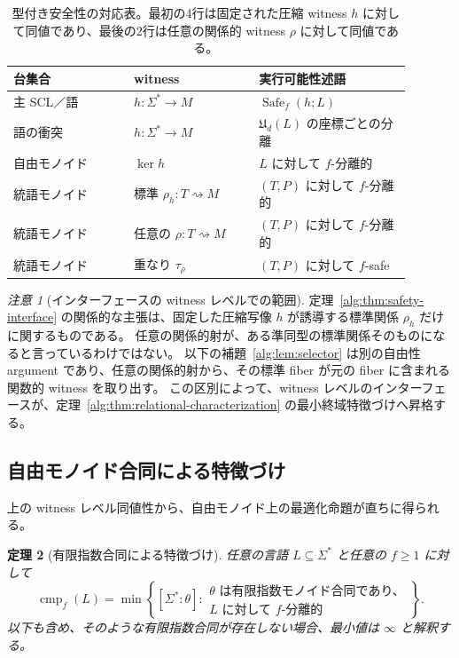 \documentclass[10pt,a4paper]{ltjsarticle}
\newtheorem{theorem}{定理}[section]
\theoremstyle{definition}
\theoremstyle{remark}
\newtheorem{remark}[theorem]{注意}
\newcommand{\cmp}{\operatorname{cmp}}
\newcommand{\relto}{\mathrel{\rightsquigarrow}}
\begin{document}
\begin{table}[t]
\centering
\caption{型付き安全性の対応表。最初の4行は固定された圧縮 witness $h$ に対して同値であり、最後の2行は任意の関係的 witness $\rho$ に対して同値である。}
\label{tab:typed-safety-dictionary}
\small
\begin{tabular}{@{}>{\raggedright\arraybackslash}p{0.27\linewidth}
                  >{\raggedright\arraybackslash}p{0.28\linewidth}
                  >{\raggedright\arraybackslash}p{0.34\linewidth}@{}}
\toprule
\textbf{台集合} & \textbf{witness} & \textbf{実行可能性述語}\\
\midrule
主 SCL／語 & $h:\Sigma^*\to M$ & $\operatorname{Safe}_f(h;L)$\\
語の衝突 & $h:\Sigma^*\to M$ & $\mathfrak U_d(L)$ の座標ごとの分離\\
自由モノイド & $\ker h$ & $L$ に対して $f$-分離的\\
統語モノイド & 標準 $\rho_h:T\relto M$ & $(T,P)$ に対して $f$-分離的\\
\midrule
統語モノイド & 任意の $\rho:T\relto M$ & $(T,P)$ に対して $f$-分離的\\
統語モノイド & 重なり $\tau_\rho$ & $(T,P)$ に対して $f$-safe\\
\bottomrule
\end{tabular}
\end{table}

\begin{remark}[インターフェースの witness レベルでの範囲]
\label{alg:rem:witness-scope}
定理~\ref{alg:thm:safety-interface} の関係的な主張は、固定した圧縮写像 $h$ が誘導する標準関係 $\rho_h$ だけに関するものである。
任意の関係的射が、ある準同型の標準関係そのものになると言っているわけではない。
以下の補題~\ref{alg:lem:selector} は別の自由性 argument であり、任意の関係的射から、その標準 fiber が元の fiber に含まれる関数的 witness を取り出す。
この区別によって、witness レベルのインターフェースが、定理~\ref{alg:thm:relational-characterization} の最小終域特徴づけへ昇格する。
\end{remark}

\subsection{自由モノイド合同による特徴づけ}

上の witness レベル同値性から、自由モノイド上の最適化命題が直ちに得られる。

\begin{theorem}[有限指数合同による特徴づけ]
\label{alg:thm:free-congruence}
任意の言語 $L\subseteq\Sigma^*$ と任意の $f\ge1$ に対して
\[
\cmp_f(L)
=
\min\left\{
[\Sigma^*:\theta]:
\begin{array}{l}
\theta\text{ は有限指数モノイド合同であり、}\\
L\text{ に対して }f\text{-分離的}
\end{array}
\right\}.
\]
以下も含め、そのような有限指数合同が存在しない場合、最小値は $\infty$ と解釈する。
\end{theorem}
\end{document}
